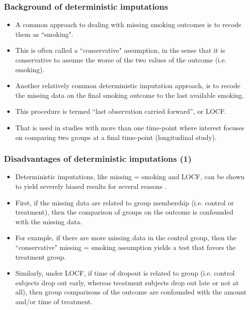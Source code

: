 \documentclass{beamer}
\begin{document}
\begin{frame}
\frametitle{Background of deterministic imputations}
\begin{itemize}
\item A common approach to dealing with missing smoking outcomes is to recode them as ``smoking".
\vspace{10pt} 
\item This is often called a ``conservative" assumption, in the sense that it is conservative to assume the worse of the two values of the outcome (i.e. smoking). 
\vspace{10pt}
\item Another relatively common deterministic imputation approach, is to recode the missing data on the final smoking outcome to the last available smoking.
\vspace{10pt}
\item This procedure is termed ``last observation carried forward'', or LOCF. 
\vspace{10pt}
\item That is used in studies with more than one time-point where interest focuses on comparing two groups at a final time-point (longitudinal study).
\end{itemize}
\end{frame}
\begin{frame}
\frametitle{Disadvantages of deterministic imputations (1)}
\begin{itemize}
\item Deterministic imputations, like missing = smoking and LOCF, can be shown to yield severely biased results for several reasons \citep{schafer2002missing}. 
\vspace{10pt} 
\item First, if the missing data are related to group membership (i.e. control or treatment), then the comparison of groups on the outcome is confounded with the missing data.
\vspace{10pt}
\item For example, if there are more missing data in the control group, then the ``conservative" missing = smoking assumption yields a test that favors the treatment group.
\vspace{10pt}
\item Similarly, under LOCF, if time of dropout is related to group (i.e. control subjects drop out early, whereas treatment subjects
drop out late or not at all), then group comparisons of the outcome are confounded with the amount and/or time of treatment.
\end{itemize}
\end{frame}
\end{document}
